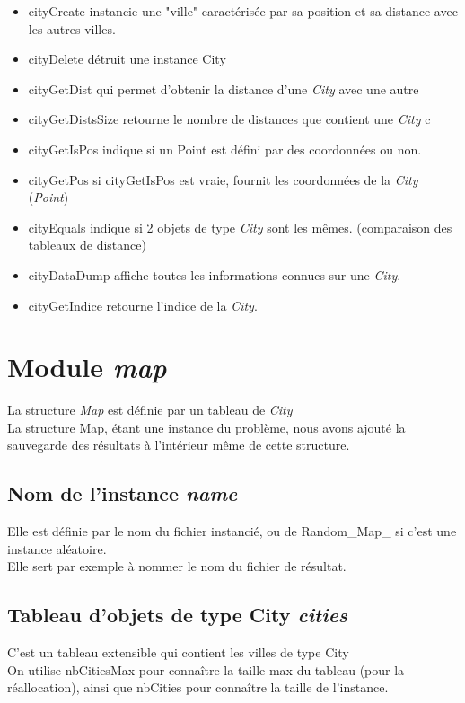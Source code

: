 \documentclass[12pt]{report}
\begin{document}
\begin{itemize}
	\item cityCreate instancie une "ville" caractérisée par sa position et sa distance avec les autres villes.
    \item cityDelete détruit une instance City
    \item cityGetDist qui permet d'obtenir la distance d'une \textit{City} avec une autre
    \item cityGetDistsSize retourne le nombre de distances que contient une \textit{City} c
    \item cityGetIsPos indique si un Point est défini par des coordonnées ou non.
    \item cityGetPos si cityGetIsPos est vraie, fournit les coordonnées de la \textit{City} (\textit{Point})
    \item cityEquals indique si 2 objets de type \textit{City} sont les mêmes. (comparaison des tableaux de distance)
    \item cityDataDump affiche toutes les informations connues sur une \textit{City}.
    \item cityGetIndice retourne l'indice de la \textit{City}.
\end{itemize}

\section{Module \textit{map}}

La structure \textit{Map} est définie par un tableau de \textit{City}\\
La structure Map, étant une instance du problème, nous avons ajouté la sauvegarde des résultats à l'intérieur même de cette structure.

\subsection{Nom de l'instance \textit{name}}

Elle est définie par le nom du fichier instancié, ou de Random\_Map\_ si c'est une instance aléatoire.\\
Elle sert par exemple à nommer le nom du fichier de résultat.

\subsection{Tableau d'objets de type City \textit{cities}}

C'est un tableau extensible qui contient les villes de type City\\
On utilise nbCitiesMax pour connaître la taille max du tableau (pour la réallocation), ainsi que nbCities pour connaître la taille de l'instance.
\end{document}

